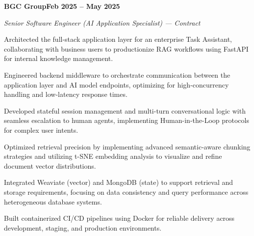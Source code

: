 \documentclass[letterpaper,10pt]{article}
\newcommand{\headingBf}[2]{\par\noindent\hspace*{10pt}\textbf{#1}\hfill\textbf{#2}}
\newcommand{\headingIt}[2]{\par\noindent\hspace*{10pt}\textit{#1}\hfill\textit{#2}}
\newenvironment{resume_list}{\vspace{-7pt}\begin{itemize}[itemsep=-2pt, parsep=1pt, leftmargin=30pt]}{\end{itemize}}
\begin{document}
  \headingBf{BGC Group}{Feb 2025 -- May 2025}
  \headingIt{Senior Software Engineer (AI Application Specialist) --- Contract}{}
  \begin{resume_list}
    \item Architected the full-stack application layer for an enterprise Task Assistant, collaborating with business users to productionize RAG workflows using FastAPI for internal knowledge management.
    \item Engineered backend middleware to orchestrate communication between the application layer and AI model endpoints, optimizing for high-concurrency handling and low-latency response times.
    \item Developed stateful session management and multi-turn conversational logic with seamless escalation to human agents, implementing Human-in-the-Loop protocols for complex user intents.
    \item Optimized retrieval precision by implementing advanced semantic-aware chunking strategies and utilizing t-SNE embedding analysis to visualize and refine document vector distributions.
    \item Integrated Weaviate (vector) and MongoDB (state) to support retrieval and storage requirements, focusing on data consistency and query performance across heterogeneous database systems.
    \item Built containerized CI/CD pipelines using Docker for reliable delivery across development, staging, and production environments.
  \end{resume_list}
\end{document}
